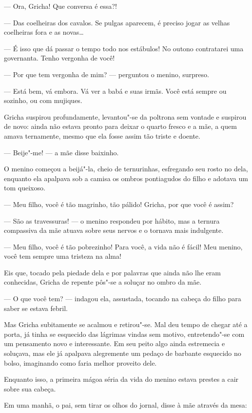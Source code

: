 --- Ora, Gricha! Que conversa é essa?!

--- Das coelheiras dos cavalos. Se pulgas aparecem, é preciso jogar as
velhas coelheiras fora e as novas\ldots{}

--- É isso que dá passar o tempo todo nos estábulos! No outono
contratarei uma governanta. Tenho vergonha de você!

--- Por que tem vergonha de mim? --- perguntou o menino, surpreso.

--- Está bem, vá embora. Vá ver a babá e suas irmãs. Você está sempre ou
sozinho, ou com mujiques.

Gricha suspirou profundamente, levantou"-se da poltrona sem vontade e
suspirou de novo: ainda não estava pronto para deixar o quarto
fresco e a mãe, a quem amava ternamente, mesmo que ela fosse assim tão
triste e doente.

--- Beije"-me! --- a mãe disse baixinho.

O menino começou a beijá"-la, cheio de ternurinhas, esfregando seu rosto
no dela, enquanto ela apalpava sob a camisa os ombros pontiagudos do
filho e adotava um tom queixoso.

--- Meu filho, você é tão magrinho, tão pálido! Gricha, por que você é
assim?

--- São as travessuras! --- o menino respondeu por hábito, mas a ternura
compassiva da mãe atuava sobre seus nervos e o tornava mais indulgente.

--- Meu filho, você é tão pobrezinho! Para você, a vida não é fácil! Meu
menino, você tem sempre uma tristeza na alma!

Eis que, tocado pela piedade dela e por palavras que ainda não lhe eram
conhecidas, Gricha de repente pôs"-se a soluçar no ombro da mãe.

--- O que você tem? --- indagou ela, assustada, tocando na cabeça do
filho para saber se estava febril.

Mas Gricha subitamente se acalmou e retirou"-se. Mal deu tempo de chegar
até a porta, já tinha se esquecido das lágrimas vindas sem motivo,
entretendo"-se com um pensamento novo e interessante. Em seu peito algo
ainda estremecia e soluçava, mas ele já apalpava alegremente um pedaço
de barbante esquecido no bolso, imaginando como faria melhor proveito
dele.

\asterisc

Enquanto isso, a primeira mágoa séria da vida do menino estava prestes a
cair sobre sua cabeça.

Em uma manhã, o pai, sem tirar os olhos do jornal, disse à mãe através
da mesa:


